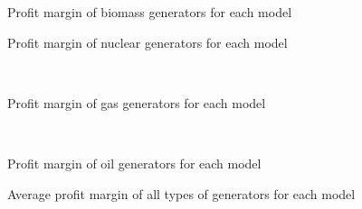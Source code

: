 \begin{minipage}{0.495\textwidth} 
\begin{figure}[H]
    \centering
    \setlength\fheight{4cm}
    \setlength{}
    
    \caption{Profit margin of biomass generators for each model}
    \label{fig:biomass}
\end{figure}
\end{minipage}
\begin{minipage}{0.495\textwidth} 
\begin{figure}[H]
    \centering
    \setlength\fheight{4cm}
    \setlength{}
    
    \caption{Profit margin of nuclear generators for each model}
    \label{fig:nuclear}
\end{figure}
\end{minipage}\\
\begin{minipage}{\textwidth} 
\begin{figure}[H]
    \centering
    \setlength\fheight{4cm}
    \setlength{}
    
        \caption{Profit margin of gas generators for each model}
    \label{fig:gas}
\end{figure}
\end{minipage} \\
\begin{minipage}{0.495\textwidth} 
\begin{figure}[H]
    \centering
    \setlength\fheight{4cm}
    \setlength{}
    
        \caption{Profit margin of oil generators for each model}
    \label{fig:oil}
\end{figure}
\end{minipage}
\begin{minipage}{0.495\textwidth} 
\begin{figure}[H]
    \centering
    \setlength\fheight{4cm}
    \setlength{}
    
        \caption{Average profit margin of all types of generators for each model}
    \label{fig:margin}
\end{figure}
\end{minipage}
